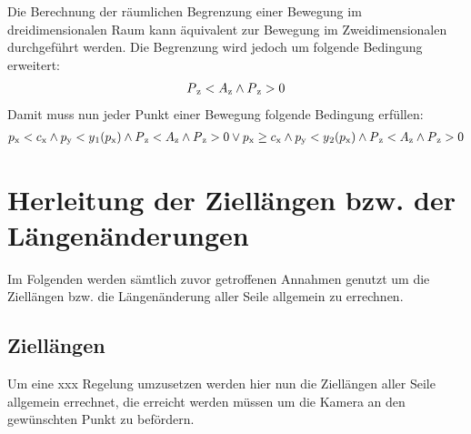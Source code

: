 \documentclass[12pt,titlepage]{article}
\begin{document}
		Die Berechnung der räumlichen Begrenzung einer Bewegung im dreidimensionalen Raum kann äquivalent zur Bewegung im Zweidimensionalen durchgeführt werden. Die Begrenzung wird jedoch um folgende Bedingung erweitert:
		\begin{align}
		P\textsubscript{z}<A\textsubscript{z}\land P\textsubscript{z}>0
		\end{align}
		Damit muss nun jeder Punkt einer Bewegung folgende Bedingung erfüllen:
		\begin{align}
			p\textsubscript{x}<c\textsubscript{x} 
			\land 	p\textsubscript{y}<y\textsubscript{1}(p\textsubscript{x})
			\land	P\textsubscript{z}<A\textsubscript{z}
			\land 	P\textsubscript{z}>0 
			\lor
			p\textsubscript{x} \geq c\textsubscript{x} 
			\land 	p\textsubscript{y}<y\textsubscript{2}(p\textsubscript{x})
			\land	P\textsubscript{z}<A\textsubscript{z}
			\land 	P\textsubscript{z}>0
		\end{align}
		\pagebreak
	\section{Herleitung der Ziellängen bzw. der Längenänderungen}
	Im Folgenden werden sämtlich zuvor getroffenen Annahmen genutzt um die Ziellängen bzw. die Längenänderung aller Seile allgemein zu errechnen.
		\subsection{Ziellängen}
		Um eine xxx Regelung umzusetzen werden hier nun die Ziellängen aller Seile allgemein errechnet, die erreicht werden müssen um die Kamera an den gewünschten Punkt zu befördern.
\end{document}

